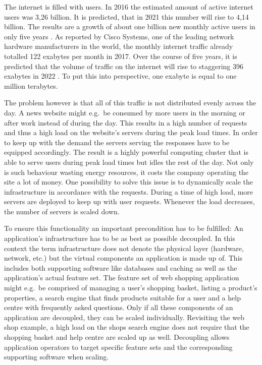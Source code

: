 
The internet is filled with users. In 2016 the estimated amount of active
internet users was 3,26 billion. It is predicted, that in 2021 this number will
rise to 4,14 billion. The results are a growth of about one billion new monthly
active users in only five years
\autocite{eMarketerAnzahlderInternetnutzer2017}. As reported by Cisco Systems,
one of the leading network hardware manufacturers in the world, the monthly
internet traffic already totalled 122 exabytes per month in 2017. Over the
course of five years, it is predicted that the volume of traffic on the
internet will rise to staggering 396 exabytes in 2022
\autocite{SystemsDatenvolumendesglobalen2018}. To put this into perspective,
one exabyte is equal to one million terabytes.

The problem however is that all of this traffic is not distributed evenly
across the day. A news website might e.g.\ be consumed by more users in the
morning or after work instead of during the day. This results in a high number
of requests and thus a high load on the website's servers during the peak load
times. In order to keep up with the demand the servers serving the responses
have to be equipped accordingly. The result is a highly powerful computing
cluster that is able to serve users during peak load times but idles the rest
of the day. Not only is such behaviour wasting energy resources, it costs the
company operating the site a lot of money. One possibility to solve this issue
is to dynamically scale the infrastructure in accordance with the requests.
During a time of high load, more servers are deployed to keep up with user
requests. Whenever the load decreases, the number of servers is scaled down.

To ensure this functionality an important precondition has to be fulfilled: An
application's infrastructure has to be as best as possible decoupled. In this
context the term infrastructure does not denote the physical layer (hardware,
network, etc.) but the virtual components an application is made up of. This
includes both supporting software like databases and caching as well as the
application's actual feature set. The feature set of web shopping application
might e.g.\ be comprised of managing a user's shopping basket, listing a
product's properties, a search engine that finds products suitable for a
user and a help centre with frequently asked questions. Only if all these
components of an application are decoupled, they can be scaled individually.
Revisiting the web shop example, a high load on the shops search engine does
not require that the shopping basket and help centre are scaled up as well.
Decoupling allows application operators to target specific feature sets and the
corresponding supporting software when scaling.

